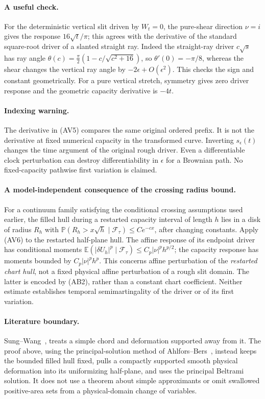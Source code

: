 \documentclass[11pt]{article}
\theoremstyle{definition}\newtheorem{definition}[theorem]{Definition}
\theoremstyle{remark}\newtheorem{remark}[theorem]{Remark}
\begin{document}
\paragraph{A useful check.}
For the deterministic vertical slit driven by $W_t=0$, the pure-shear
direction $\nu=i$ gives the response $16\sqrt t/\pi$; this agrees
with the derivative of the standard square-root driver of a slanted
straight ray. Indeed the straight-ray driver $c\sqrt{s}$ has ray angle
$\theta(c)=\tfrac\pi2(1-c/\sqrt{c^2+16})$, so
$\theta'(0)=-\pi/8$, whereas the shear changes the vertical
ray angle by $-2\epsilon+O(\epsilon^2)$. This checks the sign
and constant geometrically. For a pure vertical stretch, symmetry gives zero
driver response and the geometric capacity derivative is $-4t$.

\paragraph{Indexing warning.}
The derivative in (AV5) compares the same original ordered prefix.
It is not the derivative at fixed numerical capacity in the transformed
curve. Inverting $s_\epsilon(t)$ changes the time argument of the
original rough driver. Even a differentiable clock perturbation can
destroy differentiability in $\epsilon$ for a Brownian path.
No fixed-capacity pathwise first variation is claimed.

\paragraph{A model-independent consequence of the crossing radius bound.}
For a continuum family satisfying the conditional crossing assumptions
used earlier, the filled hull during a restarted capacity interval of
length $h$ lies in a disk of radius $R_h$ with
$\mathbb P(R_h>x\sqrt h\mid\mathcal F_\tau)\le C e^{-cx}$,
after changing constants. Apply (AV6) to the restarted half-plane hull.
The affine response of its endpoint driver has conditional moments
$\mathbb E(|\delta U_h|^p\mid\mathcal F_\tau)\le C_p|\nu|^ph^{p/2}$;
the capacity response has moments bounded by $C_p|\nu|^ph^p$.
This concerns affine perturbation of the \emph{restarted chart hull},
not a fixed physical affine perturbation of a rough slit domain.
The latter is encoded by (AB2), rather than a constant chart coefficient.
Neither estimate establishes temporal semimartingality of the driver or
of its first variation.

\paragraph{Literature boundary.}
Sung--Wang~\cite[Theorem 1.1]{sung-wang}, treats a simple chord and
deformation supported away from it. The proof above, using the principal-solution method of
Ahlfors--Bers~\cite{ahlfors-bers}, instead keeps the
bounded filled hull fixed, pulls a compactly supported smooth physical
deformation into its uniformizing half-plane, and uses the principal
Beltrami solution. It does not use a theorem about simple approximants
or omit swallowed positive-area sets from a physical-domain change of
variables.
\end{document}
